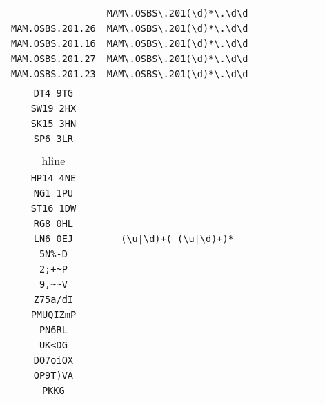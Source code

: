 \begin{longtable}{cccccccc}
\begin{tabular}{ll}
    \verb|MAM.OSBS.2012069.22| & \verb|MAM\.OSBS\.201(\d)*\.\d\d|\\
\verb|MAM.OSBS.201.26| & \verb|MAM\.OSBS\.201(\d)*\.\d\d|\\
\verb|MAM.OSBS.201.16| & \verb|MAM\.OSBS\.201(\d)*\.\d\d|\\
\verb|MAM.OSBS.201.27| & \verb|MAM\.OSBS\.201(\d)*\.\d\d|\\
\verb|MAM.OSBS.201.23| & \verb|MAM\.OSBS\.201(\d)*\.\d\d|
\end{tabular}
\\\midrule 
\begin{tabular}{l}
    \verb|EIRE|\\
\verb|DT4 9TG|\\
\verb|SW19 2HX|\\
\verb|SK15 3HN|\\
\verb|SP6 3LR|\\
\\hline\\
\verb|HP14 4NE|\\
\verb|NG1 1PU|\\
\verb|ST16 1DW|\\
\verb|RG8 0HL|\\
\verb|LN6 0EJ|
\end{tabular}

&
\verb.(\u|\d)+( (\u|\d)+)*.
&

\begin{tabular}{l}
    \verb|(\u)*(\d)*...\u|\\
\verb|5N%-D|\\
\verb|2;+~P|\\
\verb|9,~~V|\\
\verb|Z75a/dI|\\
\verb|PMUQIZmP|
\end{tabular}

&

\begin{tabular}{l}
    \verb|\u\u(\d)*(.)*\u\u|\\
\verb|PN6RL|\\
\verb|UK<DG|\\
\verb|DO7oiOX|\\
\verb|OP9T)VA|\\
\verb|PKKG|
\end{tabular}

&


\end{longtable}
